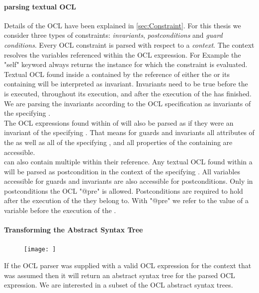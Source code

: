 \paragraph{parsing textual OCL}
\label{sec:OCLParsing}
Details of the OCL have been explained in \ref{sec:Constraint}. For this thesis we consider three types of constraints: \emph{invariants}, \emph{postconditions} and \emph{guard conditions}. Every OCL constraint is parsed with respect to a \emph{context}. The context resolves the variables referenced within the OCL expression. For Example the "self" keyword always returns the instance for which the constraint is evaluated.\\
Textual OCL found inside a  contained by the  reference of either the  or its containing  will be interpreted as invariant. Invariants need to be true before the  is executed, throughout its execution, and after the execution of the  has finished. We are parsing the invariants according to the OCL specification as invariants of the specifying . \\
The OCL expressions found within  of  will also be parsed as if they were an invariant of the specifying .
That means for guards and invariants all attributes of the  as well as all  of the specifying , and all properties of the containing  are accessible.\\
 can also contain multiple  within their  reference. Any textual OCL found within a  will be parsed as postcondition in the context of the specifying . All variables accessible for guards and invariants are also accessible for postconditions. Only in postconditions the OCL "@pre" is allowed. Postconditions are required to hold after the execution of the  they belong to. With "@pre" we refer to the value of a variable before the execution of the .

\paragraph{Transforming the Abstract Syntax Tree}
\begin{figure}
\texttt{[image: ]}
\end{figure}
If the OCL parser was supplied with a valid OCL expression for the context that was assumed then it will return an abstract syntax tree for the parsed OCL expression. We are interested in a subset of the OCL abstract syntax trees. 

